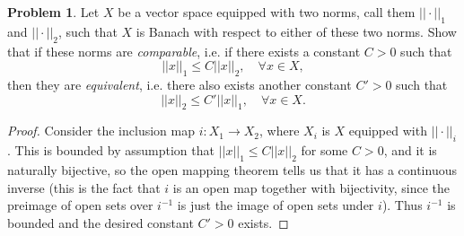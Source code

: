 \documentclass[12pt]{article}
\theoremstyle{definition}
\newtheorem{ex}{Problem}
\begin{document}
\begin{ex}
	Let $X$ be a vector space equipped with two norms, call them $|| \cdot ||_1$ and $||\cdot||_2$, such that $X$ is Banach with respect to either of these two norms.
	Show that if these norms are \textit{comparable}, i.e. if there exists a constant $C > 0$ such that \begin{equation*}
		||x||_1 \leq C||x||_2, \hspace{1em} \forall x \in X,
	\end{equation*}
	then they are \textit{equivalent}, i.e. there also exists another constant $C' > 0$ such that \begin{equation*}
		||x||_2 \leq C'||x||_1, \hspace{1em} \forall x \in X.
	\end{equation*}
\end{ex}
\begin{proof}
  Consider the inclusion map $i : X_1 \to X_2$, where $X_i$ is $X$ equipped with $||\cdot||_i$.
  This is bounded by assumption that $||x||_1 \leq C||x||_2$ for some $C > 0$, and it is naturally bijective, so the open mapping theorem tells us that it has a continuous inverse (this is the fact that $i$ is an open map together with bijectivity, since the preimage of open sets over $i^{-1}$ is just the image of open sets under $i$).
  Thus $i^{-1}$ is bounded and the desired constant $C' > 0$ exists.
\end{proof}
\end{document}
